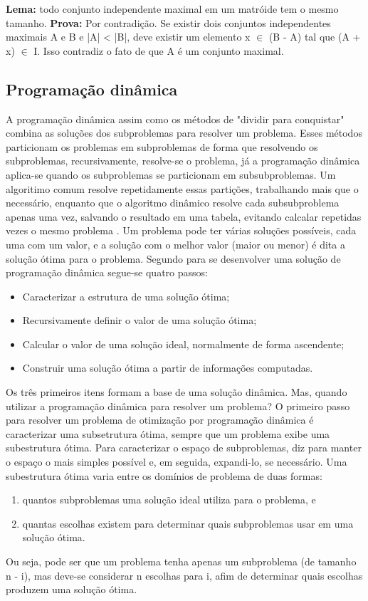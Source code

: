 \textbf{Lema:} todo conjunto independente maximal em um matróide tem o mesmo tamanho. 
\textbf{Prova:}  Por contradição. Se existir dois conjuntos independentes maximais A e B e |A| < |B|, deve existir um elemento x $\in$ (B - A) tal que (A + x) $\in$ I. Isso contradiz o fato de que A é um conjunto maximal.

\subsection{Programação dinâmica} \label{Programação dinâmica}
A programação dinâmica assim como os métodos de "dividir para conquistar" combina as soluções dos subproblemas para resolver um problema. Esses métodos particionam os problemas em subproblemas de forma que resolvendo os subproblemas, recursivamente, resolve-se o problema, já a programação dinâmica aplica-se quando os subproblemas se particionam em subsubproblemas. Um algoritimo comum resolve repetidamente essas partições, trabalhando mais que o necessário, enquanto que o algoritmo dinâmico resolve cada subsubproblema apenas uma vez, salvando o resultado em uma tabela, evitando calcalar repetidas vezes o mesmo problema \cite{cormen2009introduction}.
Um problema pode ter várias soluções possíveis, cada uma com um valor, e a solução com o melhor valor (maior ou menor) é dita a solução ótima para o problema.
Segundo \cite{cormen2009introduction} para se desenvolver uma solução de programação dinâmica segue-se quatro passos:
\begin{itemize}
\item Caracterizar a estrutura de uma solução ótima;
\item Recursivamente definir o valor de uma solução ótima;
\item Calcular o valor de uma solução ideal, normalmente de forma ascendente;
\item Construir uma solução ótima a partir de informações computadas. 
\end{itemize}
Os três primeiros itens formam a base de uma solução dinâmica. Mas, quando utilizar a programação dinâmica para resolver um problema? O primeiro passo para resolver um problema de otimização por programação dinâmica é caracterizar uma subsetrutura ótima, sempre que um problema exibe uma subestrutura ótima. 
Para caracterizar o espaço de subproblemas, diz para manter o espaço o mais simples possível e, em seguida, expandi-lo, se necessário. Uma subestrutura ótima varia entre os domínios de problema de duas formas:
\begin{enumerate}[label=(\roman*)]
\item quantos subproblemas uma solução ideal utiliza para o problema, e
\item quantas escolhas existem para determinar quais subproblemas usar em uma solução ótima.
\end{enumerate}
Ou seja, pode ser que um problema tenha apenas um subproblema (de tamanho n - i), mas deve-se considerar n escolhas para i, afim de determinar quais escolhas produzem uma solução ótima.


